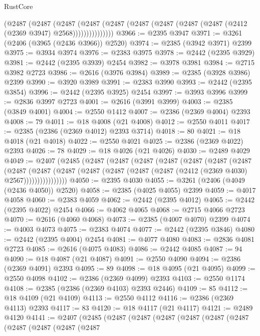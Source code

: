 \begin{lexlean}{RustCore}
\begin{coremodule}
              (@2487
                (@2487
                  (@2487
                    (@2487
                      (@2487 (@2487 (@2487 (@2487 (@2487 (@2412 (@2369 @3947) @2568)))))))))))))))
@3966 := @2395 @3947
@3971 := @3261 (@2406 (@3965 (@2436 @3966)) @2520)
@3974 := @2385 (@3942 @3971) @2399
@3975 := @3934 @3974
@3976 := @2383 @3975
@3978 := @2442 (@2395 @3929)
@3981 := @2442 (@2395 @3939) @2454
@3982 := @3978 @3981
@3984 := @2715 @3982 @2723
@3986 := @2616 (@3976 @3984)
@3989 := @2385 (@3928 @3986) @2399
@3990 := @3920 @3989
@3991 := @2383 @3990
@3993 := @2442 (@2395 @3854)
@3996 := @2442 (@2395 @3925) @2454
@3997 := @3993 @3996
@3999 := @2836 @3997 @2723
@4001 := @2616 (@3991 @3999)
@4003 := @2385 (@3849 @4001)
@4004 := @2550 @1412
@4007 := @2386 (@2369 @4004) @2393
@4008 := 79
@4011 := @18 @4008 (@21 @4008)
@4012 := @2550 @4011
@4017 := @2385 (@2386 (@2369 @4012) @2393 @3714)
@4018 := 80
@4021 := @18 @4018 (@21 @4018)
@4022 := @2550 @4021
@4025 := @2386 (@2369 @4022) @2393
@4026 := 78
@4029 := @18 @4026 (@21 @4026)
@4030 := @2489 @4029
@4049 := @2407
    (@2485
      (@2487
        (@2487
          (@2487
            (@2487
              (@2487
                (@2487
                  (@2487
                    (@2487
                      (@2487
                        (@2487
                          (@2487 (@2487 (@2487 (@2487 (@2412 (@2369 @4030) @2567))))))))))))))))
@4050 := @2395 @4030
@4055 := @3261 (@2406 (@4049 (@2436 @4050)) @2520)
@4058 := @2385 (@4025 @4055) @2399
@4059 := @4017 @4058
@4060 := @2383 @4059
@4062 := @2442 (@2395 @4012)
@4065 := @2442 (@2395 @4022) @2454
@4066 := @4062 @4065
@4068 := @2715 @4066 @2723
@4070 := @2616 (@4060 @4068)
@4073 := @2385 (@4007 @4070) @2399
@4074 := @4003 @4073
@4075 := @2383 @4074
@4077 := @2442 (@2395 @3846)
@4080 := @2442 (@2395 @4004) @2454
@4081 := @4077 @4080
@4083 := @2836 @4081 @2723
@4085 := @2616 (@4075 @4083)
@4086 := @2442 @4085
@4087 := 94
@4090 := @18 @4087 (@21 @4087)
@4091 := @2550 @4090
@4094 := @2386 (@2369 @4091) @2393
@4095 := 89
@4098 := @18 @4095 (@21 @4095)
@4099 := @2550 @4098
@4102 := @2386 (@2369 @4099) @2393
@4103 := @2550 @1174
@4108 := @2385 (@2386 (@2369 @4103) @2393 @2446)
@4109 := 85
@4112 := @18 @4109 (@21 @4109)
@4113 := @2550 @4112
@4116 := @2386 (@2369 @4113) @2393
@4117 := 83
@4120 := @18 @4117 (@21 @4117)
@4121 := @2489 @4120
@4141 := @2407
    (@2485
      (@2487
        (@2487
          (@2487
            (@2487
              (@2487
                (@2487
                  (@2487
                    (@2487
                      (@2487
                        (@2487

\end{coremodule}
\end{lexlean}
